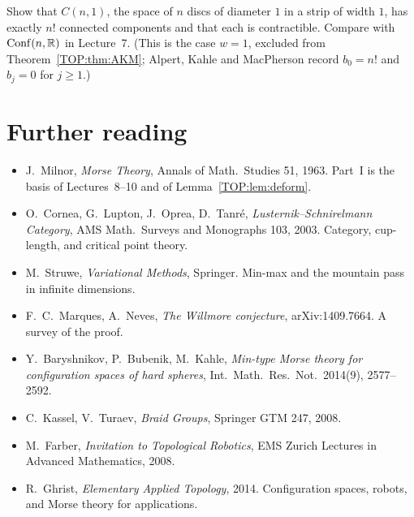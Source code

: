 \begin{exercise}
Show that $C(n,1)$, the space of $n$ discs of diameter $1$ in a strip of width $1$, has exactly $n!$ connected
components and that each is contractible. Compare with $\operatorname{Conf}(n,\mathbb{R})$ in Lecture~7. (This is the case
$w=1$, excluded from Theorem~\ref{TOP:thm:AKM}; Alpert, Kahle and MacPherson record $b_0=n!$ and $b_j=0$
for $j\ge1$.)
\end{exercise}

\section*{Further reading}
\begin{itemize}[nosep]
\item J.~Milnor, \emph{Morse Theory}, Annals of Math.\ Studies 51, 1963. Part~I is the basis of
  Lectures~8--10 and of Lemma~\ref{TOP:lem:deform}.
\item O.~Cornea, G.~Lupton, J.~Oprea, D.~Tanr\'e, \emph{Lusternik--Schnirelmann Category}, AMS Math.\ Surveys and
  Monographs 103, 2003. Category, cup-length, and critical point theory.
\item M.~Struwe, \emph{Variational Methods}, Springer. Min-max and the mountain pass in infinite dimensions.
\item F.~C.~Marques, A.~Neves, \emph{The Willmore conjecture}, arXiv:1409.7664. A survey of the proof.
\item Y.~Baryshnikov, P.~Bubenik, M.~Kahle, \emph{Min-type Morse theory for configuration spaces of hard
  spheres}, Int.\ Math.\ Res.\ Not.\ 2014(9), 2577--2592.
\item C.~Kassel, V.~Turaev, \emph{Braid Groups}, Springer GTM 247, 2008.
\item M.~Farber, \emph{Invitation to Topological Robotics}, EMS Zurich Lectures in Advanced Mathematics, 2008.
\item R.~Ghrist, \emph{Elementary Applied Topology}, 2014. Configuration spaces, robots, and Morse theory
  for applications.
\end{itemize}
